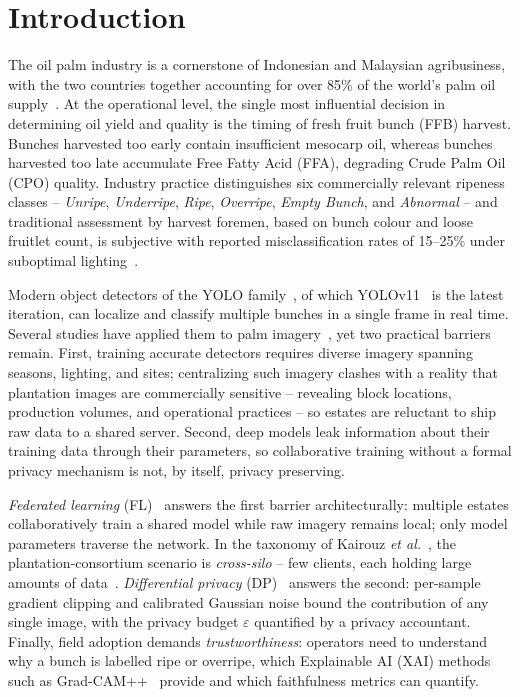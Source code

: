 \documentclass[twocolumn,a4paper,10pt]{article}
\begin{document}
\section{Introduction}
The oil palm industry is a cornerstone of Indonesian and Malaysian
agribusiness, with the two countries together accounting for over 85\% of the
world's palm oil supply~\cite{usda2024}. At the operational level, the single
most influential decision in determining oil yield and quality is the timing of
fresh fruit bunch (FFB) harvest. Bunches harvested too early contain
insufficient mesocarp oil, whereas bunches harvested too late accumulate Free
Fatty Acid (FFA), degrading Crude Palm Oil (CPO) quality. Industry practice
distinguishes six commercially relevant ripeness classes -- \emph{Unripe},
\emph{Underripe}, \emph{Ripe}, \emph{Overripe}, \emph{Empty Bunch}, and
\emph{Abnormal} -- and traditional assessment by harvest foremen, based on bunch
colour and loose fruitlet count, is subjective with reported misclassification
rates of 15--25\% under suboptimal lighting~\cite{sabri2017}.

Modern object detectors of the YOLO family~\cite{redmon2016}, of which
YOLOv11~\cite{yolov11} is the latest iteration, can localize and classify
multiple bunches in a single frame in real time. Several studies have applied
them to palm imagery~\cite{junos2022,gunawan2023,elwirehardja2021}, yet two
practical barriers remain. First, training accurate detectors requires diverse
imagery spanning seasons, lighting, and sites; centralizing such imagery clashes
with a reality that plantation images are commercially sensitive -- revealing
block locations, production volumes, and operational practices -- so estates are
reluctant to ship raw data to a shared server. Second, deep models leak
information about their training data through their parameters, so collaborative
training without a formal privacy mechanism is not, by itself, privacy
preserving.

\emph{Federated learning} (FL)~\cite{fedavg} answers the first barrier
architecturally: multiple estates collaboratively train a shared model while raw
imagery remains local; only model parameters traverse the network. In the
taxonomy of Kairouz \emph{et al.}~\cite{kairouz2021}, the plantation-consortium
scenario is \emph{cross-silo} -- few clients, each holding large amounts of
data~\cite{li2020}. \emph{Differential privacy} (DP)~\cite{abadi2016} answers
the second: per-sample gradient clipping and calibrated Gaussian noise bound the
contribution of any single image, with the privacy budget $\varepsilon$
quantified by a privacy accountant. Finally, field adoption demands
\emph{trustworthiness}: operators need to understand why a bunch is labelled
ripe or overripe, which Explainable AI (XAI) methods such as
Grad-CAM++~\cite{gradcampp} provide and which faithfulness metrics can quantify.
\end{document}
